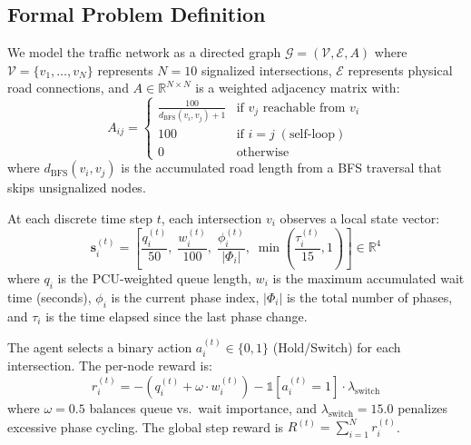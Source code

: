 \documentclass[12pt, onecolumn]{IEEEtran}
\begin{document}
\subsection{Formal Problem Definition}
We model the traffic network as a directed graph $\mathcal{G} = (\mathcal{V}, \mathcal{E}, A)$ where $\mathcal{V} = \{v_1, \ldots, v_N\}$ represents $N=10$ signalized intersections, $\mathcal{E}$ represents physical road connections, and $A \in \mathbb{R}^{N \times N}$ is a weighted adjacency matrix with:
\begin{equation}
    A_{ij} = \begin{cases}
        \frac{100}{d_{\text{BFS}}(v_i, v_j) + 1} & \text{if } v_j \text{ reachable from } v_i \\
        100 & \text{if } i = j \; (\text{self-loop}) \\
        0 & \text{otherwise}
    \end{cases}
\end{equation}
where $d_{\text{BFS}}(v_i, v_j)$ is the accumulated road length from a BFS traversal that skips unsignalized nodes.

At each discrete time step $t$, each intersection $v_i$ observes a local state vector:
\begin{equation}
    \mathbf{s}_i^{(t)} = \left[ \frac{q_i^{(t)}}{50}, \; \frac{w_i^{(t)}}{100}, \; \frac{\phi_i^{(t)}}{|\Phi_i|}, \; \min\!\left(\frac{\tau_i^{(t)}}{15}, 1\right) \right] \in \mathbb{R}^4
\end{equation}
where $q_i$ is the PCU-weighted queue length, $w_i$ is the maximum accumulated wait time (seconds), $\phi_i$ is the current phase index, $|\Phi_i|$ is the total number of phases, and $\tau_i$ is the time elapsed since the last phase change.

The agent selects a binary action $a_i^{(t)} \in \{0, 1\}$ (Hold/Switch) for each intersection. The per-node reward is:
\begin{equation}
    r_i^{(t)} = -\left( q_i^{(t)} + \omega \cdot w_i^{(t)} \right) - \mathbb{1}[a_i^{(t)} = 1] \cdot \lambda_{\text{switch}}
\end{equation}
where $\omega = 0.5$ balances queue vs.\ wait importance, and $\lambda_{\text{switch}} = 15.0$ penalizes excessive phase cycling. The global step reward is $R^{(t)} = \sum_{i=1}^{N} r_i^{(t)}$.
\end{document}
